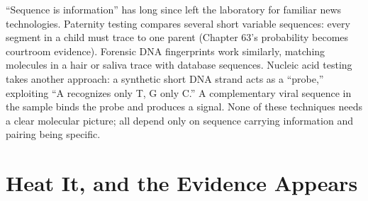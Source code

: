 ``Sequence is information'' has long since left the laboratory for familiar news technologies. Paternity testing compares several short variable sequences: every segment in a child must trace to one parent (Chapter 63's probability becomes courtroom evidence). Forensic DNA fingerprints work similarly, matching molecules in a hair or saliva trace with database sequences. Nucleic acid testing takes another approach: a synthetic short DNA strand acts as a ``probe,'' exploiting ``A recognizes only T, G only C.'' A complementary viral sequence in the sample binds the probe and produces a signal. None of these techniques needs a clear molecular picture; all depend only on sequence carrying information and pairing being specific.

\section{Heat It, and the Evidence Appears}

